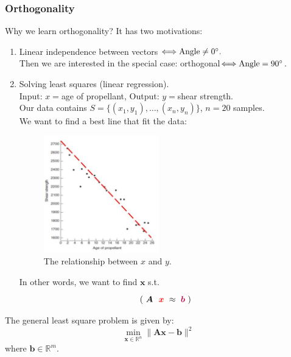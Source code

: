\subsubsection{Orthogonality}
Why we learn orthogonality? It has two motivations:
\begin{enumerate}
\item
Linear independence between vectors
$\Longleftrightarrow\text{Angle}\ne0^\circ.$\\
Then we are interested in the special case:
orthogonal$\Longleftrightarrow\text{Angle}=90^\circ$.
\item
Solving least squares (linear regression).\\
Input: $x =$age of propellant, Output: $y = $shear strength.\\
Our data contains $S=\{(x_1,y_1),\dots,(x_{n},y_{n})\}$, $n=20$ samples.\\
We want to find a best line that fit the data:
\begin{figure}[H]
\centering
\includegraphics[width=5cm]{week6/regression}
\caption{The relationship between $x$ and $y$.}
\end{figure}
In other words, we want to find $\bm x$ s.t.
\[
    (\tikzmark{identity}{$\bm A$}\tikzmark[red]{G}{$\bm x$}
    \approx\tikzmark[purple]{C}{$\bm b$})
\]
\end{enumerate}
\newpage
The general least square problem is given by:
\[
\min_{\bm x\in\mathbb{R}^{n}}\|\bm{Ax}-\bm b\|^2
\]
where $\bm b\in\mathbb{R}^{m}$.
